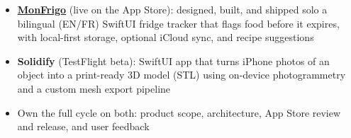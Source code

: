 \begin{itemize}
    \item \textbf{\href{https://apps.apple.com/ca/app/monfrigo/id6808321210}{MonFrigo}} (live on the App Store): designed, built, and shipped solo a bilingual (EN/FR) SwiftUI fridge tracker that flags food before it expires, with local-first storage, optional iCloud sync, and recipe suggestions
    \item \textbf{Solidify} (TestFlight beta): SwiftUI app that turns iPhone photos of an object into a print-ready 3D model (STL) using on-device photogrammetry and a custom mesh export pipeline
    \item Own the full cycle on both: product scope, architecture, App Store review and release, and user feedback
\end{itemize}
